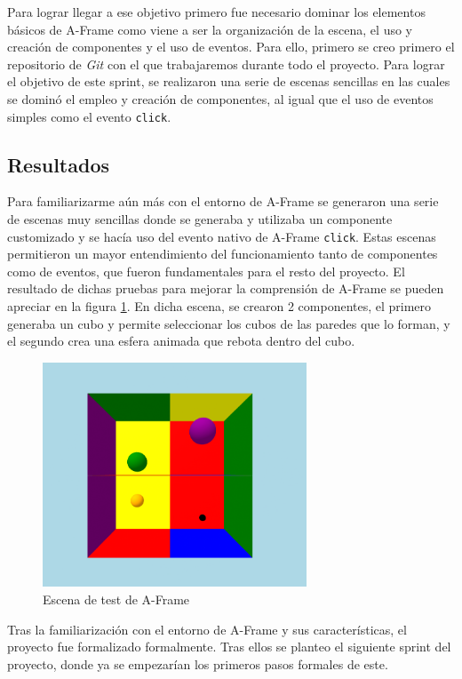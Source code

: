 \documentclass[a4paper, 12pt]{book}
\begin{document}
Para lograr llegar a ese objetivo primero fue necesario dominar los elementos básicos de A-Frame como viene a ser la organización de la escena, el uso y creación de componentes y el uso de eventos. 
Para ello, primero se creo primero el repositorio de \textit{Git} con el que trabajaremos durante todo el proyecto. Para lograr el objetivo de este sprint, se realizaron una serie de escenas sencillas en las cuales se dominó el empleo y creación de componentes, al igual que el uso de eventos simples como el evento \texttt{click}.

\subsection{Resultados}
\label{subsec:resultados0}
Para familiarizarme aún más con el entorno de A-Frame se generaron una serie de escenas muy sencillas donde se generaba y utilizaba un componente customizado y se hacía uso del evento nativo de A-Frame \texttt{click}. Estas escenas permitieron un mayor entendimiento del funcionamiento tanto de componentes como de eventos, que fueron fundamentales para el resto del proyecto.
El resultado de dichas pruebas para mejorar la comprensión de A-Frame se pueden apreciar en la figura \ref{fig:sprint0}. En dicha escena, se crearon 2 componentes, el primero generaba un cubo y permite seleccionar los cubos de las paredes que lo forman, y el segundo crea una esfera animada que rebota dentro del cubo. 
\begin{figure}[H] 
  \centering
  \includegraphics[width=0.7\textwidth]{img/primera_escena.png} 
  \caption{Escena de test de A-Frame}
  \label{fig:sprint0}
\end{figure}

Tras la familiarización con el entorno de A-Frame y sus características, el proyecto fue formalizado formalmente. Tras ellos se planteo el siguiente sprint del proyecto, donde ya se empezarían los primeros pasos formales de este. 
\end{document}
